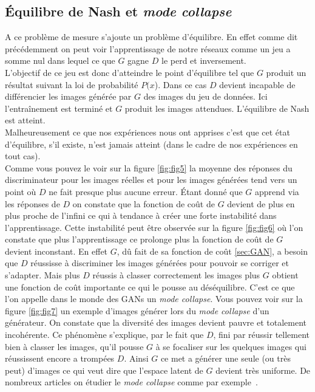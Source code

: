 \documentclass[11pt,francais]{article}
\begin{document}
\subsection{Équilibre de Nash et \textit{mode collapse}}
\label{sec:Nash_Collapse}
A ce problème de mesure s'ajoute un problème d'équilibre. 
En effet comme dit précédemment on peut voir l'apprentissage de notre réseaux comme un jeu a somme nul dans lequel ce que \(G\) gagne \(D\) le perd et inversement.\\
L'objectif de ce jeu est donc d'atteindre le point d'équilibre tel que \(G\) produit un résultat suivant la loi de probabilité \(P(x\)). Dans ce cas \(D\) devient incapable de différencier les images générée par \(G\) des images du jeu de données. Ici l'entraînement est terminé et \(G\) produit les images attendues. L'équilibre de Nash est atteint.\\
Malheureusement ce que nos expériences nous ont apprises c'est que cet état d'équilibre, s'il existe, n'est jamais atteint (dans le cadre de nos expériences en tout cas).\\
Comme vous pouvez le voir sur la figure \ref{fig:fig5} la moyenne des réponses du discriminateur pour les images réelles et pour les images générées tend vers un point où \(D\) ne fait presque plus aucune erreur. Étant donné que \(G\) apprend via les réponses de \(D\) on constate que la fonction de coût de \(G\) devient de plus en plus proche de l'infini ce qui à tendance à créer une forte instabilité dans l'apprentissage. Cette instabilité peut être observée sur la figure \ref{fig:fig6} où l'on constate que plus l'apprentissage ce prolonge plus la fonction de coût de \(G\) devient inconstant.
En effet \(G\), dû fait de sa fonction de coût \ref{sec:GAN}, a besoin que \(D\) réussisse à discriminer les images générées pour pouvoir se corriger et s'adapter. Mais plus \(D\) réussis à classer correctement les images plus \(G\) obtient une fonction de coût importante ce qui le pousse au déséquilibre. C'est ce que l'on appelle dans le monde des GANs un \textit{mode collapse}. Vous pouvez voir sur la figure \ref{fig:fig7} un exemple d'images générer lors du \textit{mode collapse} d'un générateur. On constate que la diversité des images devient pauvre et totalement incohérente. Ce phénomène s'explique, par le fait que \(D\), fini par réussir tellement bien à classer les images, qu'il pousse \(G\) à se focaliser sur les quelques images qui réussissent encore a trompées \(D\). Ainsi \(G\) ce met a générer une seule (ou très peut) d'images ce qui veut dire que l'espace latent de \(G\) devient très uniforme. De nombreux articles on étudier le \textit{mode collapse} comme par exemple~\cite{NIPS2014_5423}.\\
\end{document}
